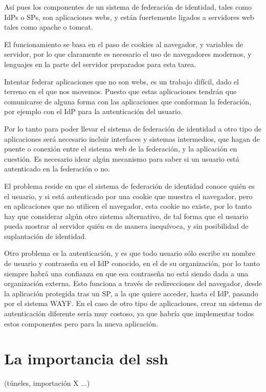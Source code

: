     Así pues los componentes de un sistema de federación de identidad,
    tales como IdPs o SPs, son aplicaciones webs, y están fuertemente
    ligados a servidores web tales como apache o tomcat.

    El funcionamiento se basa en el paso de cookies al navegador, y
    variables de servidor, por lo que claramente es necesario el uso de
    navegadores modernos, y lenguajes en la parte del servidor preparados
    para esta tarea.

    Intentar federar aplicaciones que no son webs, es un trabajo difícil,
    dado el terreno en el que nos movemos. Puesto que estas aplicaciones
    tendrán que comunicarse de alguna forma con las aplicaciones que
    conforman la federación, por ejemplo con el IdP para la autenticación
    del usuario.

    Por lo tanto para poder llevar el sistema de federación de identidad a
    otro tipo de aplicaciones será necesario incluir interfaces y sistemas
    intermedios, que hagan de puente o conexión entre el sistema web de la
    federación, y la aplicación en cuestión. Es necesario idear algún
    mecanismo para saber si un usuario está autenticado en la federación o
    no.

    El problema reside en que el sistema de federación de identidad conoce
    quién es el usuario, y si está autenticado por una cookie que muestra
    el navegador, pero en aplicaciones que no utilicen el navegador, esta
    cookie no existe, por lo tanto hay que considerar algún otro sistema
    alternativo, de tal forma que el usuario pueda mostrar al servidor
    quién es de manera inequívoca, y sin posibilidad de suplantación de
    identidad.

    Otro problema es la autenticación, y es que todo usuario sólo escribe
    su nombre de usuario y contraseña en el IdP conocido, en el de su
    organización, por lo tanto siempre habrá una confianza en que esa
    contraseña no está siendo dada a una organización externa. Esto
    funciona a través de redirecciones del navegador, desde la aplicación
    protegida tras un SP, a la que quiere acceder, hasta el IdP, pasando
    por el sistema WAYF. En el caso de otro tipo de aplicaciones, crear un
    sistema de autenticación diferente sería muy costoso, ya que habría que
    implementar todos estos componentes pero para la nueva aplicación.

    \section{La importancia del ssh}
         (túneles, importación X ...)
